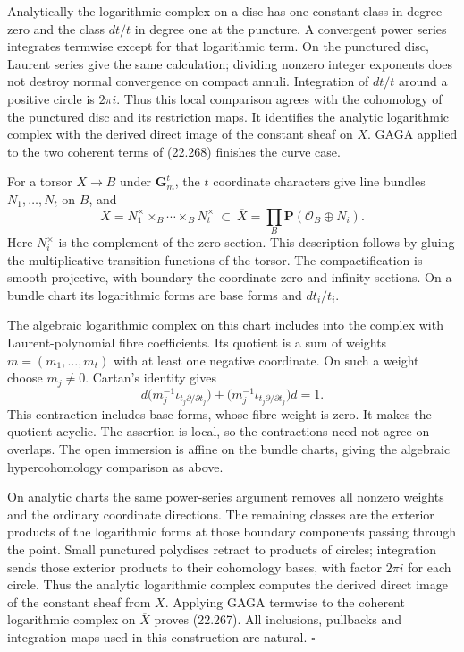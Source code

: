 \documentclass[
  11pt,
  a4paper,
]{article}
\begin{document}
Analytically the logarithmic complex on a disc has one constant class in
degree zero and the class \(dt/t\) in degree one at the puncture. A
convergent power series integrates termwise except for that logarithmic
term. On the punctured disc, Laurent series give the same calculation;
dividing nonzero integer exponents does not destroy normal convergence
on compact annuli. Integration of \(dt/t\) around a positive circle is
\(2\pi i\). Thus this local comparison agrees with the cohomology of the
punctured disc and its restriction maps. It identifies the analytic
logarithmic complex with the derived direct image of the constant sheaf
on \(X\). GAGA applied to the two coherent terms of (22.268) finishes
the curve case.

For a torsor \(X\to B\) under \(\mathbf G_m^t\), the \(t\) coordinate
characters give line bundles \(N_1,\ldots,N_t\) on \(B\), and \[
 X=N_1^\times\times_B\cdots\times_BN_t^\times
 \ \subset\
 \overline X=\prod_B\mathbf P(\mathcal O_B\oplus N_i).
 \tag{22.269}
\] Here \(N_i^\times\) is the complement of the zero section. This
description follows by gluing the multiplicative transition functions of
the torsor. The compactification is smooth projective, with boundary the
coordinate zero and infinity sections. On a bundle chart its logarithmic
forms are base forms and \(dt_i/t_i\).

The algebraic logarithmic complex on this chart includes into the
complex with Laurent-polynomial fibre coefficients. Its quotient is a
sum of weights \(m=(m_1,\ldots,m_t)\) with at least one negative
coordinate. On such a weight choose \(m_j\ne0\). Cartan's identity gives
\[
 d\bigl(m_j^{-1}\iota_{t_j\partial/\partial t_j}\bigr)
 +\bigl(m_j^{-1}\iota_{t_j\partial/\partial t_j}\bigr)d=1.
 \tag{22.270}
\] This contraction includes base forms, whose fibre weight is zero. It
makes the quotient acyclic. The assertion is local, so the contractions
need not agree on overlaps. The open immersion is affine on the bundle
charts, giving the algebraic hypercohomology comparison as above.

On analytic charts the same power-series argument removes all nonzero
weights and the ordinary coordinate directions. The remaining classes
are the exterior products of the logarithmic forms at those boundary
components passing through the point. Small punctured polydiscs retract
to products of circles; integration sends those exterior products to
their cohomology bases, with factor \(2\pi i\) for each circle. Thus the
analytic logarithmic complex computes the derived direct image of the
constant sheaf from \(X\). Applying GAGA termwise to the coherent
logarithmic complex on \(\overline X\) proves (22.267). All inclusions,
pullbacks and integration maps used in this construction are natural.
\(\square\)
\end{document}
